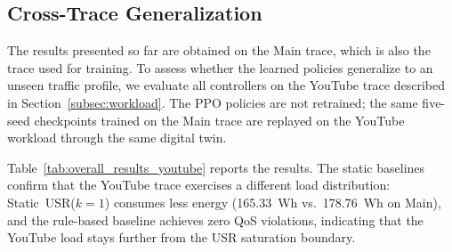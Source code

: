 \documentclass[a4paper,fleqn]{cas-sc}
\begin{document}
\subsection{Cross-Trace Generalization}
\label{subsec:generalization}

The results presented so far are obtained on the Main trace, which is also the trace used for training. To assess whether the learned policies generalize to an unseen traffic profile, we evaluate all controllers on the YouTube trace described in Section~\ref{subsec:workload}. The PPO policies are not retrained; the same five-seed checkpoints trained on the Main trace are replayed on the YouTube workload through the same digital twin.

Table~\ref{tab:overall_results_youtube} reports the results. The static baselines confirm that the YouTube trace exercises a different load distribution: Static~USR($k=1$) consumes less energy (165.33~Wh vs.\ 178.76~Wh on Main), and the rule-based baseline achieves zero QoS violations, indicating that the YouTube load stays further from the USR saturation boundary.

\begin{table}[width=.9\linewidth,cols=7,pos=h]
\centering
\caption{Overall results on the YouTube trace (cross-trace generalization). The PPO policies are identical to those trained on the Main trace and are not retrained. Notation follows Table~\ref{tab:overall_results}.}
\label{tab:overall_results_youtube}
\small
{}
\end{table}
\end{document}
